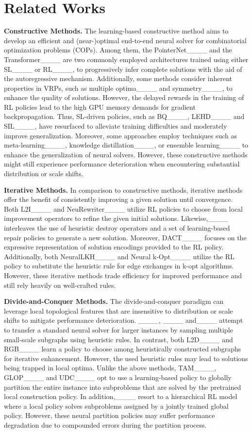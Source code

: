 \section{Related Works}
\textbf{Constructive Methods.} The learning-based constructive method aims to develop an efficient and (near-)optimal end-to-end neural solver for combinatorial optimization problems (COPs). Among them, the PointerNet____ and the Transformer____ are two commonly employed architectures trained using either SL____ or RL____, to progressively infer complete solutions with the aid of the autoregressive mechanism. Additionally, some methods consider inherent properties in VRPs, such as multiple optima____ and symmetry____, to enhance the quality of solutions. However, the delayed rewards in the training of RL policies lead to the high GPU memory demands for gradient backpropagation. Thus, SL-driven policies, such as BQ____, LEHD____ and SIL____, have resurfaced to alleviate training difficulties and moderately improve generalization. Moreover, some approaches employ techniques such as meta-learning____, knowledge distillation____, or ensemble learning____ to enhance the generalization of neural solvers. However, these constructive methods might still experience performance deterioration when encountering substantial distribution or scale shifts.

\noindent \textbf{Iterative Methods.} In comparison to constructive methods, iterative methods offer the benefit of consistently improving a given solution until convergence. Both L2I____ and NeuRewriter____ utilize RL policies to choose from local improvement operators to refine the given initial solutions. Likewise,____ interleaves the use of heuristic destroy operators and a set of learning-based repair policies to generate a new solution. Moreover, DACT____ focuses on the expressive representation of solution encodings provided to the RL policy. Additionally, both NeuralLKH____ and Neural k-Opt____ utilize the RL policy to substitute the heuristic rule for edge exchanges in k-opt algorithms. However, these iterative methods trade efficiency for improved performance and still rely heavily on well-crafted rules.

\noindent \textbf{Divide-and-Conquer Methods.} The divide-and-conquer paradigm can leverage local topological features that are insensitive to distribution or scale shifts to mitigate performance deterioration. ____, ____ and____ attempt to transfer a standard neural solver for larger instances by sampling multiple small-scale subgraphs using heuristic rules. In contrast, both L2D____ and RGB____ learn a policy to choose among heuristically constructed subgraphs for iterative enhancement. However, the used heuristic rules may lead to solutions being trapped in local optima. Unlike the above methods, TAM____, GLOP____ and UDC____ opt to use a learning-based policy to globally partition the entire instance into subproblems that are solved by the pretrained local construction policy. In addition,____ resort to a hierarchical RL model where a local policy solves subproblems assigned by a jointly trained global policy. However, these neural partition policies may suffer performance degradation due to compounded errors during the partition process.